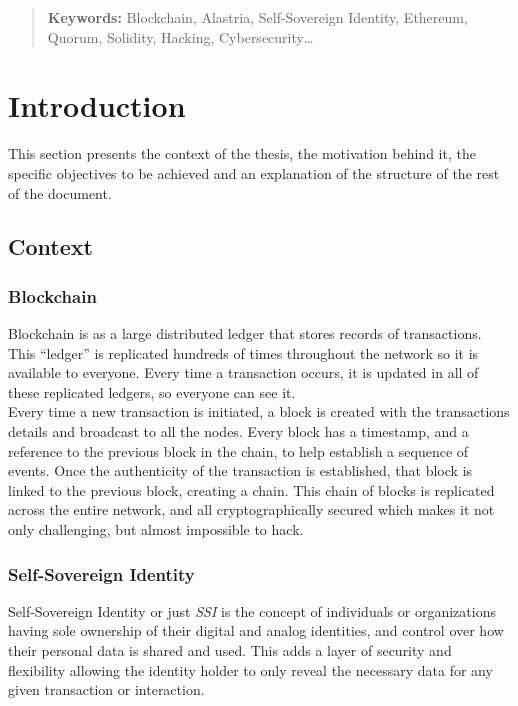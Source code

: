 \documentclass[a4paper, 12pt]{article} %
\begin{document}
\newpage

\begin{abstract}
    \normalsize
    
    \textbf{Keywords:} Blockchain, Alastria, Self-Sovereign Identity, Ethereum, Quorum, Solidity, Hacking, Cybersecurity\ldots
\end{abstract}

\newpage
{} %

\section{Introduction}
    This section presents the context of the thesis, the motivation behind it, the specific objectives to be achieved and an explanation of the structure of the rest of the document.
    
    \subsection{Context}
        \subsubsection{Blockchain}
            Blockchain\cite{blockchain-sum}\cite{blockchainGartner} is as a large distributed ledger that stores records of transactions. This “ledger” is replicated hundreds of times throughout the network so it is available to everyone. Every time a transaction occurs, it is updated in all of these replicated ledgers, so everyone can see it.\\
            
            Every time a new transaction is initiated, a block is created with the transactions details and broadcast to all the nodes. Every block has a timestamp, and a reference to the previous block in the chain, to help establish a sequence of events. Once the authenticity of the transaction is established, that block is linked to the previous block, creating a chain. This chain of blocks is replicated across the entire network, and all cryptographically secured which makes it not only challenging, but almost impossible to hack.
            
        \subsubsection{Self-Sovereign Identity}
            Self-Sovereign Identity or just \textit{SSI}\cite{ssi} is the concept of individuals or organizations having sole ownership of their digital and analog identities, and control over how their personal data is shared and used. This adds a layer of security and flexibility allowing the identity holder to only reveal the necessary data for any given transaction or interaction.\\
            
\end{document}
